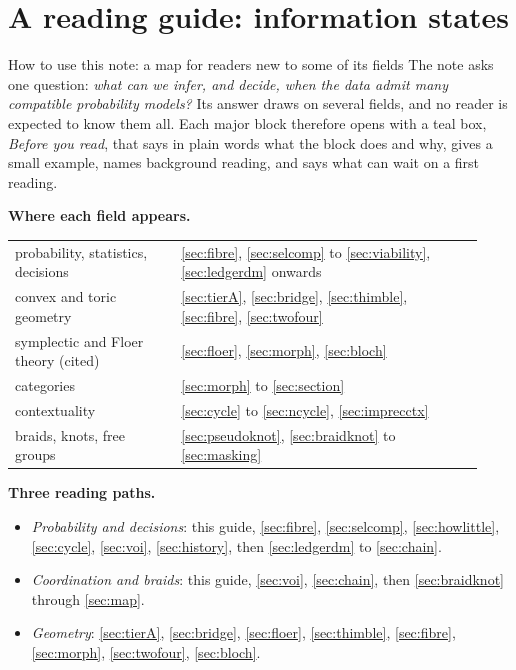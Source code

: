 \documentclass[11pt]{article}
\theoremstyle{definition}\newtheorem{definition}[theorem]{Definition}\newtheorem{remark}[theorem]{Remark}\newtheorem{example}[theorem]{Example}\newtheorem{problem}[theorem]{Open problem}\crefname{problem}{Problem}{Problems}
\begin{document}
\section{A reading guide: information states}\label{sec:guide}
\begin{mapbox}{How to use this note: a map for readers new to some of its fields}
The note asks one question: \emph{what can we infer, and decide, when the data admit many compatible probability models?} Its answer draws on several fields, and no reader is expected to know them all. Each major block therefore opens with a teal box, \emph{Before you read}, that says in plain words what the block does and why, gives a small example, names background reading, and says what can wait on a first reading.

\smallskip\textbf{Where each field appears.}\par
\begin{tabular}{@{}>{\raggedright\arraybackslash}p{0.33\linewidth}>{\raggedright\arraybackslash}p{0.6\linewidth}@{}}
probability, statistics, decisions & \cref{sec:fibre}, \cref{sec:selcomp} to \cref{sec:viability}, \cref{sec:ledgerdm} onwards\\
convex and toric geometry & \cref{sec:tierA}, \cref{sec:bridge}, \cref{sec:thimble}, \cref{sec:fibre}, \cref{sec:twofour}\\
symplectic and Floer theory (cited) & \cref{sec:floer}, \cref{sec:morph}, \cref{sec:bloch}\\
categories & \cref{sec:morph} to \cref{sec:section}\\
contextuality & \cref{sec:cycle} to \cref{sec:ncycle}, \cref{sec:imprecctx}\\
braids, knots, free groups & \cref{sec:pseudoknot}, \cref{sec:braidknot} to \cref{sec:masking}\\
\end{tabular}

\smallskip\textbf{Three reading paths.}
\begin{itemize}[leftmargin=1.3em,itemsep=1pt]
\item \emph{Probability and decisions}: this guide, \cref{sec:fibre}, \cref{sec:selcomp}, \cref{sec:howlittle}, \cref{sec:cycle}, \cref{sec:voi}, \cref{sec:history}, then \cref{sec:ledgerdm} to \cref{sec:chain}.
\item \emph{Coordination and braids}: this guide, \cref{sec:voi}, \cref{sec:chain}, then \cref{sec:braidknot} through \cref{sec:map}.
\item \emph{Geometry}: \cref{sec:tierA}, \cref{sec:bridge}, \cref{sec:floer}, \cref{sec:thimble}, \cref{sec:fibre}, \cref{sec:morph}, \cref{sec:twofour}, \cref{sec:bloch}.
\end{itemize}


\end{mapbox}
\end{document}
